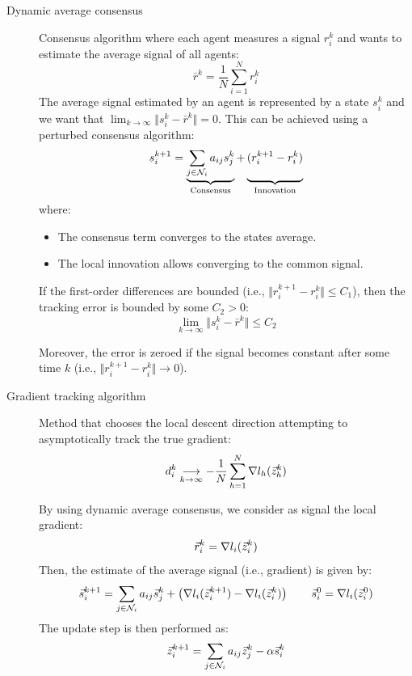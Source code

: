 \begin{description}
    \item[Dynamic average consensus] 
        Consensus algorithm where each agent measures a signal $r_i^k$ and wants to estimate the average signal of all agents:
        \[ \bar{r}^k = \frac{1}{N} \sum_{i=1}^{N} r_i^k \]
        The average signal estimated by an agent is represented by a state $s_i^k$ and we want that $\lim_{k \rightarrow \infty} \Vert s_i^k - \bar{r}^k \Vert = 0$. This can be achieved using a perturbed consensus algorithm:
        \[ 
            s_i^{k+1} = 
            \underbrace{\sum_{j \in \mathcal{N}_i} a_{ij} s_j^k}_{\text{Consensus}} +
            \underbrace{\vphantom{\sum_{j \in \mathcal{N}_i}}(r_i^{k+1} - r_i^k)}_{\text{Innovation}}
        \]
        where:
        \begin{itemize}
            \item The consensus term converges to the states average.
            \item The local innovation allows converging to the common signal.
        \end{itemize}

        \begin{theorem}
            If the first-order differences are bounded (i.e., $\Vert r_i^{k+1} - r_i^{k} \Vert \leq C_1$), then the tracking error is bounded by some $C_2 > 0$:
            \[ \lim_{k \rightarrow \infty} \Vert s_i^k - \bar{r}^k \Vert \leq C_2 \]

            Moreover, the error is zeroed if the signal becomes constant after some time $k$ (i.e., $\Vert r_i^{k+1} - r_i^{k} \Vert \rightarrow 0$).
        \end{theorem}

    \item[Gradient tracking algorithm] 
        Method that chooses the local descent direction attempting to asymptotically track the true gradient:
        \[ d_i^k \underset{k \rightarrow \infty}{\longrightarrow} - \frac{1}{N} \sum_{h=1}^N \nabla l_h({\vec{z}}_h^k) \] 

        By using dynamic average consensus, we consider as signal the local gradient:
        \[ \vec{r}_i^k = \nabla l_i({\vec{z}}_i^k) \]
        Then, the estimate of the average signal (i.e., gradient) is given by:
        \[
            \vec{s}_i^{k+1} = \sum_{j \in \mathcal{N}_i} a_{ij} \vec{s}_j^k + \left( \nabla l_i({\vec{z}}_i^{k+1}) - \nabla l_i({\vec{z}}_i^k) \right) \qquad {\vec{s}}_i^0 = \nabla l_i({\vec{z}}_i^0)
        \]
        The update step is then performed as:
        \[ {\vec{z}}_i^{k+1} = \sum_{j \in \mathcal{N}_i} a_{ij} {\vec{z}}_j^k - \alpha \vec{s}_i^k \]


\end{description}
